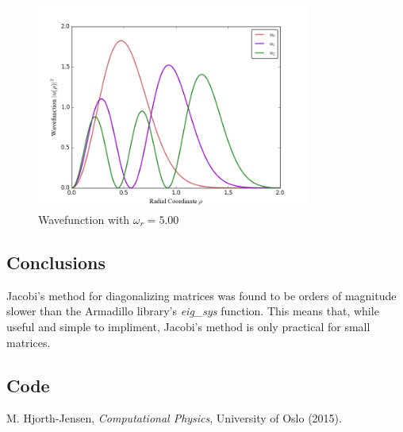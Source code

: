 \documentclass[11pt]{article}
\begin{document}
    \begin{figure}[H] \begin{center}
    \includegraphics[width=0.8\textwidth]{../Code/WavefunctionOmega5.png}
    \end{center} \caption{Wavefunction with $\omega_r = 5.00$} \end{figure}

\subsection{Conclusions}

    Jacobi's method for diagonalizing matrices was found to be orders of magnitude slower than the Armadillo library's {\em eig\_sys} function. This means that, while useful and simple to impliment, Jacobi's method is only practical for small matrices.

\subsection{Code}

    

    

    

    

\begin{thebibliography}{1}

    M. Hjorth-Jensen, {\em Computational Physics}, University of Oslo (2015). 

\end{thebibliography}
\end{document}

